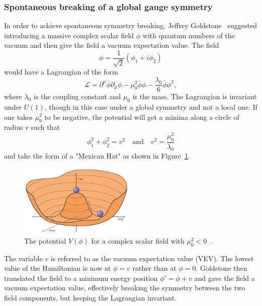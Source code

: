 \subsubsection{Spontaneous breaking of a global gauge symmetry}
In order to achieve spontaneous symmetry breaking, Jeffrey Goldstone~\cite{Goldstone:1961eq} suggested introducing a massive complex scalar field $\phi$ with quantum numbers of the vacuum and then give the field a vacuum expectation value. The field
\begin{equation}
\phi = \frac{1}{\sqrt{2}}(\phi_1+i\phi_2)  
\end{equation}
would have a Lagrangian of the form
\begin{equation}
\mathcal{L} = \partial^{\mu}\bar{\phi}\partial_{\mu}\phi-\mu_0^2\bar{\phi}\phi-\frac{\lambda_0}{6}\bar{\phi}\phi^2,
\end{equation}
where $\lambda_0$ is the coupling constant and $\mu_0$ is the mass. The Lagrangian is invariant under $U(1)$, though in this case under a global symmetry and not a local one. If one takes $\mu_0^2$ to be negative, the potential will get a minima along a circle of radius $v$ such that
\begin{equation}
  \phi_1^2+\phi_2^2 = v^2 \quad \textrm{and}\quad v^2=\frac{\mu_0^2}{\lambda_0}
\end{equation}
and take the form of a "Mexican Hat" as shown in Figure~\ref{fig:theory:higgspot}. 
  \begin{figure}[h!]
  \centering
  \includegraphics[width=0.49\textwidth]{figures/theory/higgspotential.png}
  \caption{The potential $V(\phi)$ for a complex scalar field with $\mu_0^2<0$~\cite{Ellis:1638469}.}
  \label{fig:theory:higgspot}
  \end{figure}
The variable $v$ is referred to as the vacuum expectation value (VEV). The lowest value of the Hamiltonian is now at $\phi=v$ rather than at $\phi=0$. Goldstone then translated the field to a minimum energy position $\phi'=\phi+v$ and gave the field a vacuum expectation value, effectively breaking the symmetry between the two field components, but keeping the Lagrangian invariant.
